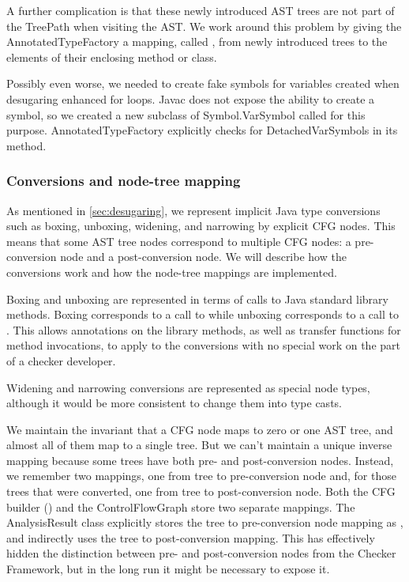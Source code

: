 A further complication is that these newly introduced AST trees are
not part of the TreePath when visiting the AST.  We work around this
problem by giving the AnnotatedTypeFactory a mapping, called
, from newly introduced trees
to the elements of their enclosing method or class.

Possibly even worse, we needed to create fake symbols for variables
created when desugaring enhanced for loops.  Javac does not expose the
ability to create a symbol, so we created a new subclass of
Symbol.VarSymbol called  for
this purpose.  AnnotatedTypeFactory explicitly checks for
DetachedVarSymbols in its  method.



\subsubsection{Conversions and node-tree mapping}
\label{sec:conversions}

As mentioned in \autoref{sec:desugaring}, we represent implicit Java
type conversions such as boxing, unboxing, widening, and narrowing by
explicit CFG nodes.  This means that some AST tree nodes correspond to
multiple CFG nodes: a pre-conversion node and a post-conversion node.
We will describe how the conversions work and how the node-tree
mappings are implemented.

Boxing and unboxing are represented in terms of calls to Java standard
library methods.  Boxing corresponds to a call to
 while unboxing corresponds to a call to
.  This allows annotations on the library
methods, as well as transfer functions for method invocations, to
apply to the conversions with no special work on the part of a checker
developer.

Widening and narrowing conversions are represented as special
node types, although it would be more consistent to change them into
type casts.

We maintain the invariant that a CFG node maps to zero or one AST tree,
and almost all of them map to a single tree.  But we can't maintain a
unique inverse mapping because some trees have both pre- and
post-conversion nodes.  Instead, we remember two mappings, one from
tree to pre-conversion node and, for those trees that were converted,
one from tree to post-conversion node.  Both the CFG builder
() and the
ControlFlowGraph store two separate mappings.  The AnalysisResult class
explicitly stores the tree to pre-conversion node mapping as
, and  indirectly uses the
tree to post-conversion mapping.  This has effectively
hidden the distinction between pre- and post-conversion nodes from the
Checker Framework, but in the long run it might be necessary to expose
it.



